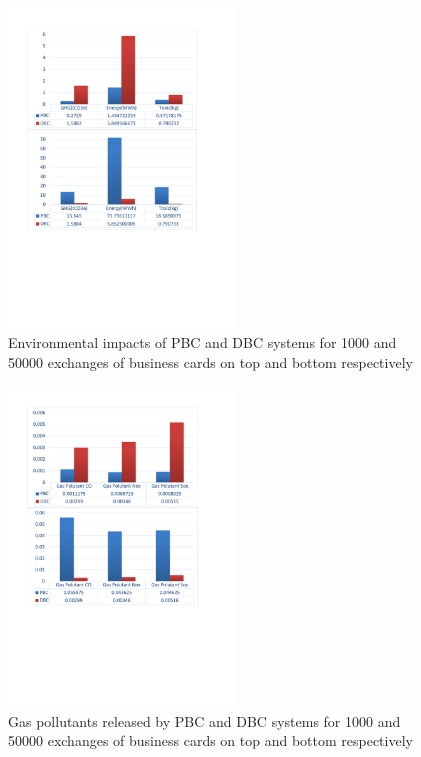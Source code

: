 \documentclass[conference]{IEEEtran}
\begin{document}
\begin{figure}[h]
\centering
\includegraphics[width=6cm]{screen1.pdf}
\caption{Environmental impacts of PBC and DBC systems for 1000 and 50000 exchanges of business cards on top and bottom respectively}
\label{screen1}
\end{figure}


\begin{figure}[h]
\centering
\includegraphics[width=6cm]{screen2.pdf}
\caption{Gas pollutants released by PBC and DBC systems for 1000 and 50000 exchanges of business cards on top and bottom respectively}
\label{screen2}
\end{figure}
\end{document}
